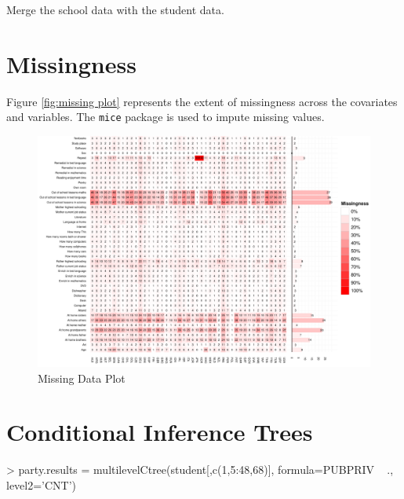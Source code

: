 \documentclass[letterpaper,11pt]{article}
\begin{document}
Merge the school data with the student data.

\begin{Schunk}
\end{Schunk}

\section{Missingness}

Figure \ref{fig:missing plot} represents the extent of missingness across the covariates and variables. The \texttt{mice} package is used to impute missing values.

\begin{figure}[tp]
\begin{center}
\includegraphics[width=\textwidth]{figures/MissingPlot.pdf}
\caption{Missing Data Plot}
\label{fig:missingplot}
\end{center}
\end{figure}


\section{Conditional Inference Trees}


\begin{Schunk}
\begin{Sinput}
> party.results = multilevelCtree(student[,c(1,5:48,68)], formula=PUBPRIV ~ ., level2='CNT')
\end{Sinput}
\end{Schunk}
\end{document}
